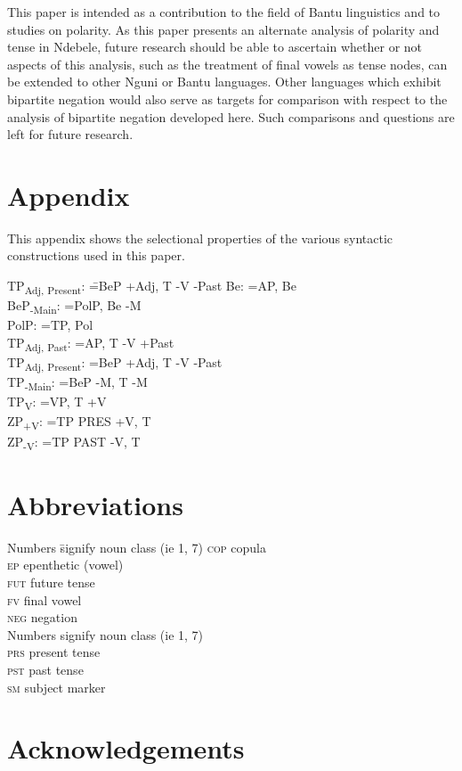 \documentclass[output=paper]{langsci/langscibook}
\begin{document}
This paper is intended as a contribution to the field of Bantu linguistics and to studies on polarity. As this paper presents an alternate analysis of polarity and tense in Ndebele, future research should be able to ascertain whether or not aspects of this analysis, such as the treatment of final vowels as tense nodes, can be extended to other Nguni or Bantu languages. Other languages which exhibit bipartite negation would also serve as targets for comparison with respect to the analysis of bipartite negation developed here. Such comparisons and questions are left for future research. 
\vspace{5 mm}

\section*{Appendix}

This appendix shows the selectional properties of the various  syntactic constructions used in this paper.

\begin{multicols}{2}
\begin{tabbing}
TP\textsubscript{Adj, Present}: \= =BeP +Adj, T -V -Past\kill
Be: \> =AP, Be\\
BeP\textsubscript{-Main}: \> =PolP, Be -M\\
PolP: \> =TP, Pol\\
TP\textsubscript{Adj, Past}: \> =AP, T -V +Past\\
TP\textsubscript{Adj, Present}: \> =BeP +Adj, T -V -Past\\
TP\textsubscript{-Main}: \> =BeP -M, T -M\\
TP\textsubscript{V}: \> =VP, T +V\\
ZP\textsubscript{+V}: \> =TP PRES +V, T \\
ZP\textsubscript{-V}: \> =TP PAST -V, T \\

\end{tabbing}
\end{multicols}

\section*{Abbreviations}
\begin{multicols}{2}
\begin{tabbing}
Numbers \= signify noun class (ie 1, 7)\kill
\textsc{cop} \> copula\\
\textsc{ep} \> epenthetic (vowel)\\
\textsc{fut} \> future tense\\
\textsc{fv} \> final vowel\\
\textsc{neg} \> negation\\
Numbers \> signify noun class (ie 1, 7)\\
\textsc{prs} \> present tense\\
\textsc{pst} \> past tense\\
\textsc{sm} \> subject marker\\
\end{tabbing}
\end{multicols}

\section*{Acknowledgements}

\printbibliography[heading=subbibliography,notkeyword=this]
\end{document}
